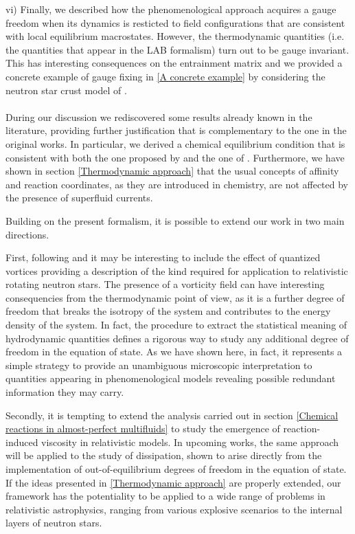 \documentclass[usenatbib]{mnras}
\begin{document}
vi) Finally, we described how the phenomenological approach acquires a gauge freedom when its dynamics is  resticted to field configurations that are consistent with local equilibrium macrostates. However, the thermodynamic quantities (i.e. the quantities that appear in the LAB formalism) turn out to be gauge invariant. This has interesting consequences on the entrainment matrix and we provided a concrete example of gauge fixing in \ref{A concrete example} by considering the neutron star crust model of \cite{langlois98}.
\\
\\
During our discussion we rediscovered some results already known in the literature, providing  further justification  that is complementary to the one in the original works. In particular, we derived a chemical equilibrium condition that is consistent with both the one proposed by \cite{langlois98} and the one of \cite{Gusakov2007}.
Furthermore, we have shown in section \ref{Thermodynamic approach} that the usual concepts of affinity and reaction coordinates, as they are introduced in chemistry, are not affected by the presence of superfluid currents.


Building on the present formalism, it is possible to  extend  our work in two main directions. 

First, following \cite{mendell1991} and \cite{carterKalb} it may be interesting to include the effect of quantized vortices providing a  description of the kind required for application to relativistic rotating neutron stars. 
The presence of a vorticity field can have interesting consequencies from the thermodynamic point of view, as it is a further degree of freedom that breaks the isotropy of the system and contributes to the energy density of the system.
In fact, the procedure to extract the statistical meaning of hydrodynamic quantities defines a rigorous way to study any additional degree of freedom in the equation of state. As we have shown here, in fact, it represents a simple strategy to provide an unambiguous microscopic interpretation to quantities appearing in phenomenological models revealing possible redundant information they may carry.

Secondly, it is tempting to extend the analysis carried out in section \ref{Chemical reactions in almost-perfect multifluids} to study the emergence of reaction-induced viscosity in relativistic models. In upcoming works, the same approach will be applied to the study of dissipation, shown to arise directly from the implementation of out-of-equilibrium degrees of freedom in the equation of state. If the ideas presented in \eqref{Thermodynamic approach} are properly extended, our framework has the potentiality to be applied to a wide range of problems in relativistic astrophysics, ranging from various explosive scenarios to the internal layers of neutron stars.
\end{document}
